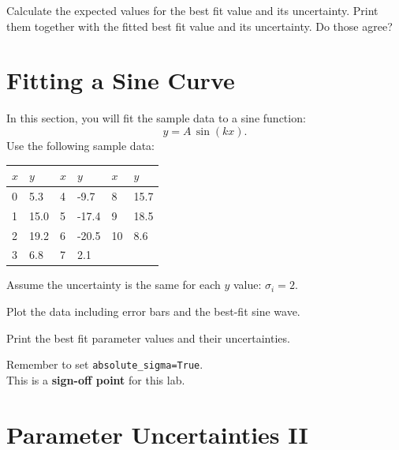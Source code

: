 \begin{print} Calculate the expected values for the best fit value and its uncertainty. Print them together with the fitted best fit value and its uncertainty. Do those agree? \end{print}


\section{Fitting a Sine Curve}

In this section, you will fit the sample data to a sine function:
\begin{displaymath}
 y = A \, \sin( k x). 
\end{displaymath}
Use the following sample data:\\
\begin{center}
\begin{tabular}{|ll| ll|ll|}
\hline
$x$ & $y$ & $x$ & $y$ & $x$ & $y$\\
\hline
0  & 5.3    & 4  & -9.7   & 8  & 15.7  \\
1  & 15.0   & 5  & -17.4  & 9  & 18.5  \\
2  & 19.2   & 6  & -20.5  & 10 & 8.6   \\
3  & 6.8    & 7  &  2.1   & &  \\
\hline
\end{tabular}
\end{center}
Assume the uncertainty is the same for each $y$ value: $\sigma_i = 2$.
\begin{plot} Plot the data including error bars and the best-fit
sine wave. \end{plot}

\begin{print} Print the best fit parameter
values and their uncertainties. \end{print}

Remember to set {\tt absolute{\_}sigma=True}.\\

This is a \textbf{sign-off point} for this lab. 

\section{Parameter Uncertainties II}


